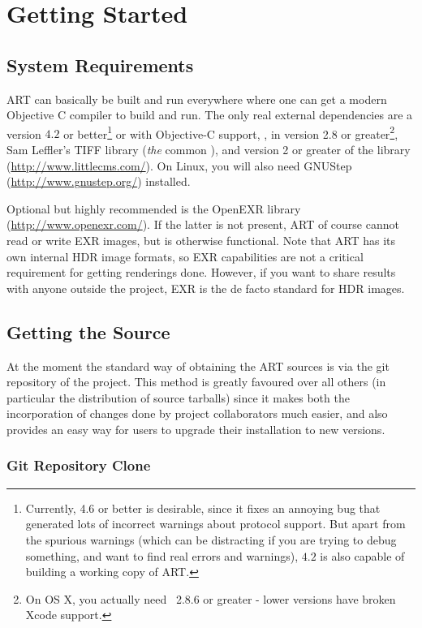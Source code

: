 \chapter{Getting Started}
\label{sec:beforeyoubegin}
\section{System Requirements}
ART can basically be built and run everywhere where one can get a
modern Objective C compiler to build and run. The only real external dependencies are a
 version $4.2$ or better\footnote{Currently,  4.6 or better is desirable, since it fixes an annoying bug that generated lots of incorrect warnings about protocol support. But apart from the spurious warnings (which can be distracting if you are trying to debug something, and want to find real errors and warnings),  $4.2$ is also capable of building a working copy of ART.} or  with Objective-C support,
,  in version 2.8 or greater\footnote{On OS X, you actually need ~2.8.6 or greater - lower versions have broken Xcode support.}, Sam Leffler's TIFF library (\ie \textit{the} common ), and version 2 or greater of the  library (\url{http://www.littlecms.com/}). On Linux, you will also need GNUStep (\url{http://www.gnustep.org/}) installed. 

Optional but highly recommended is the OpenEXR library (\url{http://www.openexr.com/}). If the latter is not present, ART of course cannot read or write EXR images, but is otherwise functional. Note that ART has its own internal HDR image formats, so EXR capabilities are not a critical requirement for getting renderings done. However, if you want to share results with anyone outside the project, EXR is the de facto standard for HDR images.

\section{Getting the Source}
At the moment the standard way of obtaining the ART sources is via the
git repository of the project. This method is greatly favoured over all
others (in particular the distribution of source tarballs) since it
makes both the incorporation of changes done by project collaborators
much easier, and also provides an easy way for users to upgrade their
installation to new versions.

\subsection{Git Repository Clone}


